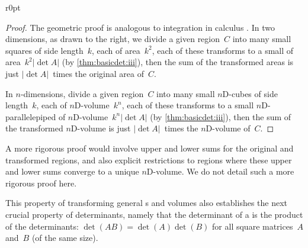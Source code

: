 \begin{wrapfigure}r{0pt}
\end{wrapfigure}
\begin{proof} 
The geometric proof is analogous to integration in calculus \cite[p.402]{Hannah96}. 
In two dimensions, as drawn to the right,  we divide a given region~\(C\) into  many small squares of side length~\(k\), each of area~\(k^2\),  each of these transforms to a small  of area~\(k^2|\det A|\) (by \cref{thm:basicdet:iii}), then the sum of the transformed areas is just \(|\det A|\)~times the  original area of~\(C\).

In  \(n\)-dimensions, divide a given region~\(C\) into  many small $n$D-cubes of side length~\(k\), each of $n$D-volume~\(k^n\),  each of these transforms to a small $n$D-parallelepiped of $n$D-volume~\(k^n|\det A|\) (by \cref{thm:basicdet:iii}), then the sum of the transformed $n$D-volume is just \(|\det A|\)~times the  $n$D-volume of~\(C\). 
\end{proof}

A more rigorous proof would involve upper and lower sums for the original and transformed regions, and also explicit restrictions to regions where these upper and lower sums converge to a unique $n$D-volume. 
We do not detail such a more rigorous proof here.


This property of transforming general s and volumes also establishes the next crucial property of determinants, namely that the determinant of a  is the product of the determinants: \(\det(AB)=\det(A)\det(B)\) for all square matrices~\(A\) and~\(B\) (of the same size).

